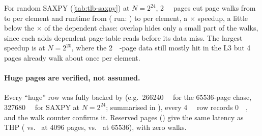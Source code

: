 For random SAXPY (\cref{tab:tlb-saxpy}) at $N=2^{24}$, \qty{2}{\mebi\byte} pages cut page walks from
 to  per element and runtime from 
( run: ) to
 per element, a $\times$ speedup, a little below the
$\times$ of the dependent chase: overlap hides only a small part of the walks, since each
adds dependent page-table reads before its data miss. The largest speedup is at $N=2^{20}$, where the
\qty{2}{\mebi\byte}-page data still mostly hit in the L3 but \qty{4}{\kibi\byte} pages already walk about once
per element.

\paragraph{Huge pages are verified, not assumed.} Every ``huge'' row was fully backed by
 (e.g.\ \qty{266240}{\kibi\byte} for the 65536-page chase, \qty{327680}{\kibi\byte} for SAXPY
at $N=2^{24}$; summarised in ), every \qty{4}{\kibi\byte} row records \qty{0}{\kibi\byte},
and the walk counter confirms it. Reserved  pages () give the same latency as THP
( vs.\  at 4096 pages,
 vs.\  at 65536), with zero
walks.
